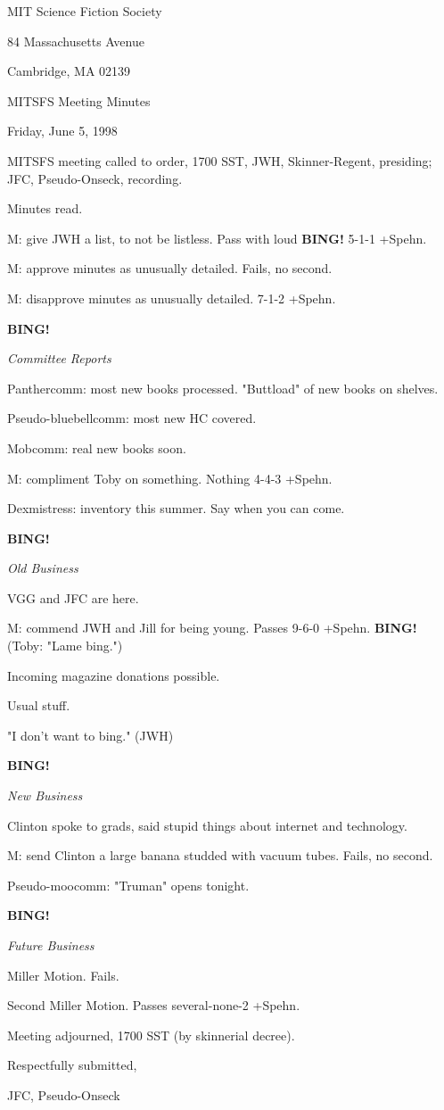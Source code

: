 \documentclass[12pt]{article}
\newcommand{\bing}{{\bf BING!} }
\newcommand{\goto}[1]{\bing \vskip 12pt \centerline{{\em{#1}}}}
\begin{document}
\begin{center}

MIT Science Fiction Society 

84 Massachusetts Avenue

Cambridge, MA 02139

\vspace{12pt}

MITSFS Meeting Minutes 

Friday, June 5, 1998

\end{center}
 
\vspace{18pt}

\setlength{\parskip}{6pt}

\noindent
MITSFS meeting called to order, 1700 SST,
JWH, Skinner-Regent, presiding; JFC, Pseudo-Onseck, recording.

Minutes read.

M: give JWH a list, to not be listless. Pass with loud \bing 5-1-1 +Spehn.

M: approve minutes as unusually detailed. Fails, no second.

M: disapprove minutes as unusually detailed. 7-1-2 +Spehn.

\goto{Committee Reports}

Panthercomm: most new books processed. "Buttload" of new books on shelves.

Pseudo-bluebellcomm: most new HC covered.

Mobcomm: real new books soon.

M: compliment Toby on something. Nothing 4-4-3 +Spehn.

Dexmistress: inventory this summer. Say when you can come.

\goto{Old Business}

VGG and JFC are here.

M: commend JWH and Jill for being young. Passes 9-6-0 +Spehn. \bing (Toby: "Lame bing.")

Incoming magazine donations possible.

Usual stuff.

"I don't want to bing." (JWH)

\goto{New Business}

Clinton spoke to grads, said stupid things about internet and technology.

M: send Clinton a large banana studded with vacuum tubes. Fails, no second.

Pseudo-moocomm: "Truman" opens tonight.

\goto{Future Business}

Miller Motion. Fails.

Second Miller Motion. Passes several-none-2 +Spehn.

\vspace{12pt}

\noindent
Meeting adjourned, 1700 SST (by skinnerial decree).

\vspace{18pt}

\centerline{Respectfully submitted,}
\centerline{JFC, Pseudo-Onseck}
\end{document}
